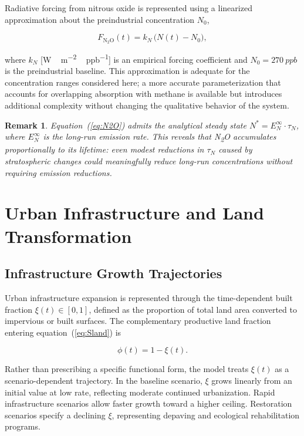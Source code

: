 \documentclass[12pt]{article}
\newtheorem{remark}{Remark}
\newcommand{\FNO}{F_{\mathrm{N_2O}}}
\begin{document}
Radiative forcing from nitrous oxide is represented using a linearized
approximation about the preindustrial concentration $N_0$,

\begin{equation}
  \FNO(t) = k_N\,\bigl(N(t) - N_0\bigr),
  \label{eq:FN2O}
\end{equation}

where $k_N$ [\si{W\,m^{-2}\,ppb^{-1}}] is an empirical forcing coefficient and
$N_0 = \SI{270}{ppb}$ is the preindustrial baseline.  This approximation is
adequate for the concentration ranges considered here; a more accurate
parameterization that accounts for overlapping absorption with methane is
available but introduces additional complexity without changing the qualitative
behavior of the system.

\begin{remark}
Equation~(\ref{eq:N2O}) admits the analytical steady state
$N^* = E_N^\infty \cdot \tau_N$, where $E_N^\infty$ is the long-run emission
rate.  This reveals that N\textsubscript{2}O accumulates proportionally to its
lifetime: even modest reductions in $\tau_N$ caused by stratospheric changes
could meaningfully reduce long-run concentrations without requiring emission
reductions.
\end{remark}

\section{Urban Infrastructure and Land Transformation}
\label{sec:infra}

\subsection{Infrastructure Growth Trajectories}

Urban infrastructure expansion is represented through the time-dependent built
fraction $\xi(t) \in [0,1]$, defined as the proportion of total land area
converted to impervious or built surfaces.  The complementary productive land
fraction entering equation~(\ref{eq:Sland}) is

\begin{equation}
  \phi(t) = 1 - \xi(t).
  \label{eq:phi}
\end{equation}

Rather than prescribing a specific functional form, the model treats $\xi(t)$ as
a scenario-dependent trajectory.  In the baseline scenario, $\xi$ grows linearly
from an initial value at low rate, reflecting moderate continued urbanization.
Rapid infrastructure scenarios allow faster growth toward a higher ceiling.
Restoration scenarios specify a declining $\xi$, representing depaving and
ecological rehabilitation programs.
\end{document}
